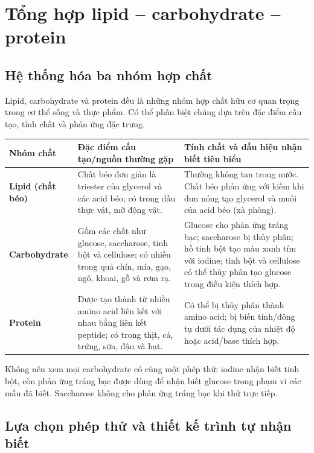 \section{Tổng hợp lipid -- carbohydrate -- protein}

\subsection{Hệ thống hóa ba nhóm hợp chất}

Lipid, carbohydrate và protein đều là những nhóm hợp chất hữu cơ quan trọng trong cơ thể sống và thực phẩm. Có thể phân biệt chúng dựa trên đặc điểm cấu tạo, tính chất và phản ứng đặc trưng.

\begin{center}
\begin{tabularx}{0.98\textwidth}{>{\bfseries}p{2.15cm}YY}
\toprule
Nhóm chất & Đặc điểm cấu tạo/nguồn thường gặp & Tính chất và dấu hiệu nhận biết tiêu biểu \\
\midrule
Lipid (chất béo) &
Chất béo đơn giản là triester của glycerol và các acid béo; có trong dầu thực vật, mỡ động vật. &
Thường không tan trong nước. Chất béo phản ứng với kiềm khi đun nóng tạo glycerol và muối của acid béo (xà phòng). \\
Carbohydrate &
Gồm các chất như glucose, saccharose, tinh bột và cellulose; có nhiều trong quả chín, mía, gạo, ngô, khoai, gỗ và rơm rạ. &
Glucose cho phản ứng tráng bạc; saccharose bị thủy phân; hồ tinh bột tạo màu xanh tím với iodine; tinh bột và cellulose có thể thủy phân tạo glucose trong điều kiện thích hợp. \\
Protein &
Được tạo thành từ nhiều amino acid liên kết với nhau bằng liên kết peptide; có trong thịt, cá, trứng, sữa, đậu và hạt. &
Có thể bị thủy phân thành amino acid; bị biến tính/đông tụ dưới tác dụng của nhiệt độ hoặc acid/base thích hợp. \\
\bottomrule
\end{tabularx}
\end{center}

Không nên xem mọi carbohydrate có cùng một phép thử: iodine nhận biết tinh bột, còn phản ứng tráng bạc được dùng để nhận biết glucose trong phạm vi các mẫu đã biết. Saccharose không cho phản ứng tráng bạc khi thử trực tiếp.

\subsection{Lựa chọn phép thử và thiết kế trình tự nhận biết}

